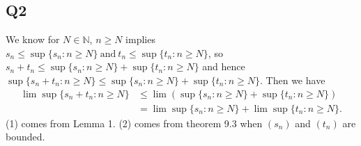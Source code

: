 \documentclass[12pt,lettersize]{article}
\newcommand{\N}{\mathbb{N}}
\begin{document}
	\subsection*{Q2}
	We know for $N\in\N$, $n\geq N$ implies $s_n\leq\sup\{s_n: n\geq N\}\ \text{and}\ t_n\leq\sup\{t_n: n\geq N\}$, so
	$s_n+t_n\leq\sup\{s_n: n\geq N\}+\sup\{t_n: n\geq N\}$ and hence $\sup\{s_n+t_n: n\geq N\}\leq\sup\{s_n: n\geq N\}+\sup\{t_n: n\geq N\}$. Then we have
	\begin{align}
		\lim\sup\{s_n+t_n: n\geq N\} &\leq\lim(\sup\{s_n: n\geq N\}+\sup\{t_n: n\geq N\})\\
									 &= \lim\sup\{s_n: n\geq N\}+\lim\sup\{t_n: n\geq N\}.
	\end{align}
	(1) comes from Lemma 1. (2) comes from theorem 9.3 when $(s_n)$ and $(t_n)$ are bounded.
	\newpage
	
\end{document}
